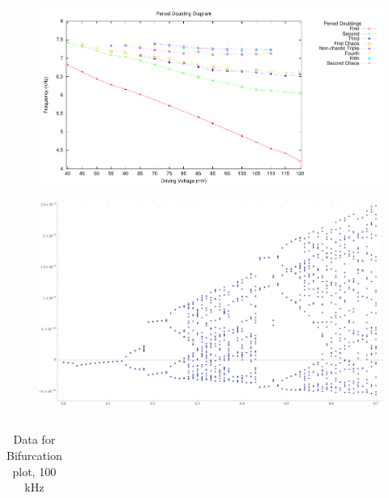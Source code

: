 \documentclass[12pt]{report}
\begin{document}
	\begin{figure}[h]
		\centering
		
	\end {figure}

	\begin{figure}[h]
		\centering
		\includegraphics{plots/general.pdf}
	\end{figure}

	\begin{figure}[h]
		\centering
		\includegraphics{simulations/circuit.png}
	\end{figure}

	\begin{tabular}{|l|l|l|}
		\hline
		 
    \end{tabular}

	\begin{table}
		\centering
		\begin{tabular}{|l|l|l|l||l|l|l|l|}
			\hline
			 
		\end{tabular}
		\label{tab:100khz}
		\caption{Data for Bifurcation plot, 100 kHz}
	\end{table}
\end{document}
